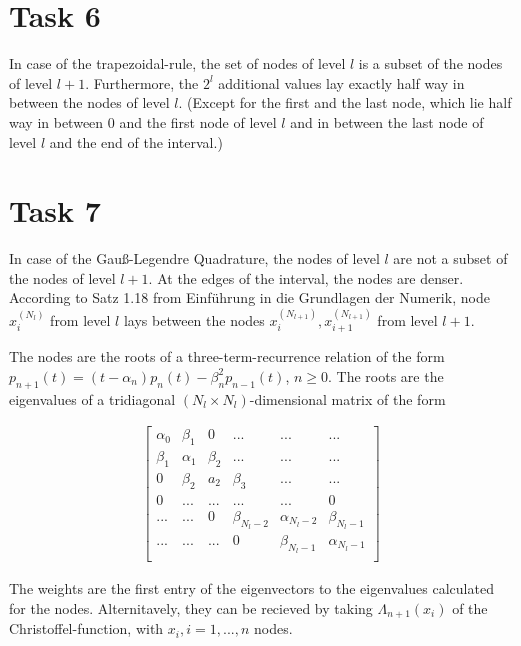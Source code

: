 \documentclass[10pt,a4paper]{article}
\begin{document}
\section*{Task 6}

In case of the trapezoidal-rule, the set of nodes of level $l$ is a subset of the nodes of level $l+1$. Furthermore, the $2^l$ additional values lay exactly half way in between the nodes of level $l$. (Except for the first and the last node, which lie half way in between 0 and the first node of level $l$ and in between the last node of level $l$ and the end of the interval.) 

\section*{Task 7}

In case of the Gauß-Legendre Quadrature, the nodes of level $l$ are not a subset of the nodes of level $l+1$. At the edges of the interval, the nodes are denser. According to Satz 1.18 from Einführung in die Grundlagen der Numerik, node $x_i^{(N_l)}$ from level $l$ lays between the nodes $x_i^{(N_{l+1})}, x_{i+1}^{(N_{l+1})}$ from level $l+1$.

The nodes are the roots of a three-term-recurrence relation of the form $p_{n+1}(t)=(t-\alpha_n)p_n(t)-\beta_n^2p_{n-1}(t)$, $n \geq 0$. 
The roots are the eigenvalues of a tridiagonal $(N_l \times N_l)$-dimensional matrix of the form

\begin{align*}
\begin{bmatrix}
\alpha_0 &  \beta_1  & 0 & ... & ... & ... \\
\beta_1 & \alpha_1 & \beta_2 & ... & ... & ... \\
 0  & \beta_2 & a_2 & \beta_3 & ... & ... \\
0   & ... & ... & ... & ... & 0 \\
... & ... &  0  & \beta_{N_l-2} & \alpha_{N_l-2} & \beta_{N_l-1}  \\
... & ... & ... & 0  & \beta_{N_l-1} & \alpha_{N_l-1} \\
\end{bmatrix}
\end{align*}



The weights are the first entry of the eigenvectors to the eigenvalues calculated for the nodes. Alternitavely, they can be recieved by taking $\Lambda_{n+1}(x_i)$ of the Christoffel-function, with $x_i, i=1,...,n$ nodes. 
\end{document}
